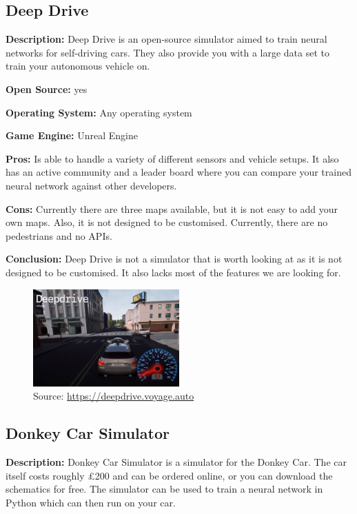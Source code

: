 \subsection{Deep Drive}
\textbf{Description:} Deep Drive \cite{DeepDrive_Website} is an open-source simulator aimed to train neural networks for self-driving cars. They also provide you with a large data set to train your autonomous vehicle on. 

\textbf{Open Source:} yes

\textbf{Operating System:} Any operating system

\textbf{Game Engine:} Unreal Engine

\textbf{Pros:} Is able to handle a variety of different sensors and vehicle setups. It also has an active community and a leader board where you can compare your trained neural network against other developers. 

\textbf{Cons:} Currently there are three maps available, but it is not easy to add your own maps. Also, it is not designed to be customised. Currently, there are no pedestrians and no APIs.

\textbf{Conclusion:} Deep Drive is not a simulator that is worth looking at as it is not designed to be customised. It also lacks most of the features we are looking for. 

\begin{figure}[H]
    \centering
    \includegraphics[width=0.5\textwidth]{Simulators/DeepDrive.JPG}
    \caption{Source: \url{https://deepdrive.voyage.auto}}
\end{figure}

\subsection{Donkey Car Simulator}
\textbf{Description:} Donkey Car Simulator is a simulator for the Donkey Car. The car itself costs roughly £200 and can be ordered online, or you can download the schematics for free. The simulator can be used to train a neural network in Python which can then run on your car. 

